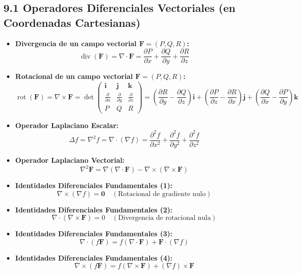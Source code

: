 \documentclass[11pt,a4paper]{article}
\begin{document}
\subsection*{9.1 Operadores Diferenciales Vectoriales (en Coordenadas Cartesianas)}

\begin{itemize}
  \item \textbf{Divergencia de un campo vectorial $\mathbf{F} = (P, Q, R)$:}
  \[
    \operatorname{div}(\mathbf{F}) = \nabla \cdot \mathbf{F} = \frac{\partial P}{\partial x} + \frac{\partial Q}{\partial y} + \frac{\partial R}{\partial z}
  \]
  \item \textbf{Rotacional de un campo vectorial $\mathbf{F} = (P, Q, R)$:}
  \[
    \operatorname{rot}(\mathbf{F}) = \nabla \times \mathbf{F} = \det\begin{pmatrix} \mathbf{i} & \mathbf{j} & \mathbf{k} \\ \frac{\partial}{\partial x} & \frac{\partial}{\partial y} & \frac{\partial}{\partial z} \\ P & Q & R \end{pmatrix} = \left(\frac{\partial R}{\partial y} - \frac{\partial Q}{\partial z}\right)\mathbf{i} + \left(\frac{\partial P}{\partial z} - \frac{\partial R}{\partial x}\right)\mathbf{j} + \left(\frac{\partial Q}{\partial x} - \frac{\partial P}{\partial y}\right)\mathbf{k}
  \]
  \item \textbf{Operador Laplaciano Escalar:}
  \[
    \Delta f = \nabla^2 f = \nabla \cdot (\nabla f) = \frac{\partial^2 f}{\partial x^2} + \frac{\partial^2 f}{\partial y^2} + \frac{\partial^2 f}{\partial z^2}
  \]
  \item \textbf{Operador Laplaciano Vectorial:}
  \[
    \nabla^2 \mathbf{F} = \nabla(\nabla \cdot \mathbf{F}) - \nabla \times (\nabla \times \mathbf{F})
  \]
  \item \textbf{Identidades Diferenciales Fundamentales (1):}
  \[
    \nabla \times (\nabla f) = \mathbf{0} \quad (\text{Rotacional de gradiente nulo})
  \]
  \item \textbf{Identidades Diferenciales Fundamentales (2):}
  \[
    \nabla \cdot (\nabla \times \mathbf{F}) = 0 \quad (\text{Divergencia de rotacional nula})
  \]
  \item \textbf{Identidades Diferenciales Fundamentales (3):}
  \[
    \nabla \cdot (f \mathbf{F}) = f(\nabla \cdot \mathbf{F}) + \mathbf{F} \cdot (\nabla f)
  \]
  \item \textbf{Identidades Diferenciales Fundamentales (4):}
  \[
    \nabla \times (f \mathbf{F}) = f(\nabla \times \mathbf{F}) + (\nabla f) \times \mathbf{F}
  \]
\end{itemize}
\end{document}
